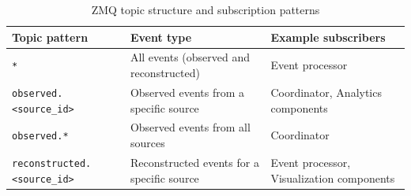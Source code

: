 \begin{table}[t]
\centering
\footnotesize
\caption{ZMQ topic structure and subscription patterns}
\label{tab:zmq-topics}
\begin{tabularx}{\textwidth}{p{4.5cm} X X}
\toprule
\textbf{Topic pattern} & \textbf{Event type} & \textbf{Example subscribers} \\
\midrule
\texttt{*} &
All events (observed and reconstructed) &
Event processor \\

\texttt{observed.<source\_id>} &
Observed events from a specific source &
Coordinator, Analytics components \\

\texttt{observed.*} &
Observed events from all sources &
Coordinator \\

\texttt{reconstructed.<source\_id>} &
Reconstructed events for a specific source &
Event processor, Visualization components \\
\bottomrule
\end{tabularx}
\end{table}